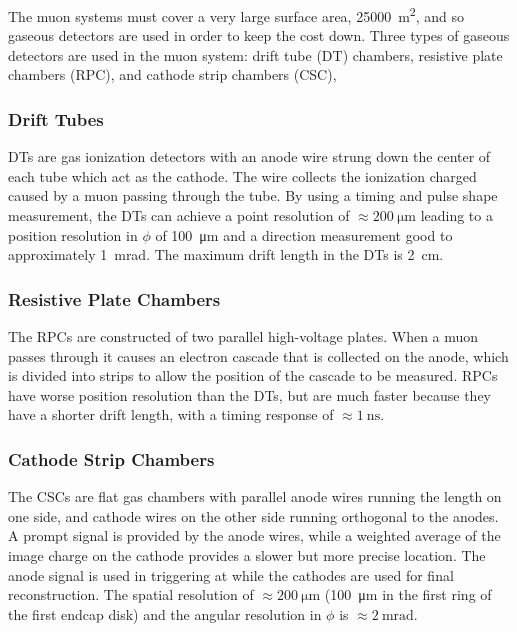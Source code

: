 The muon systems must cover a very large surface area,
\SI{25000}{\meter\squared}, and so gaseous detectors are used in order to keep
the cost down. Three types of gaseous detectors are used in the muon system:
drift tube (DT) chambers, resistive plate chambers (RPC), and cathode strip
chambers (CSC),

\subsubsection{Drift Tubes}

DTs are gas ionization detectors with an anode wire strung down the center of
each tube which act as the cathode. The wire collects the ionization charged
caused by a muon passing through the tube. By using a timing and pulse shape
measurement, the DTs can achieve a point resolution of $\approx
\SI{200}{\micro\meter}$ leading to a position resolution in $\phi$ of
\SI{100}{\micro\meter} and a direction measurement good to approximately
\SI{1}{\milli\radian}. The maximum drift length in the DTs is
\SI{2}{\centi\meter}.

\subsubsection{Resistive Plate Chambers}

The RPCs are constructed of two parallel high-voltage plates. When a muon
passes through it causes an electron cascade that is collected on the anode,
which is divided into strips to allow the position of the cascade to be
measured. RPCs have worse position resolution than the DTs, but are much
faster because they have a shorter drift length, with a timing response of
$\approx \SI{1}{\nano\second}$.

\subsubsection{Cathode Strip Chambers}

The CSCs are flat gas chambers with parallel anode wires running the length on
one side, and cathode wires on the other side running orthogonal to the anodes.
A prompt signal is provided by the anode wires, while a weighted average of the
image charge on the cathode provides a slower but more precise location. The
anode signal is used in triggering at \Lone while the cathodes are used for
final reconstruction. The spatial resolution of $\approx
\SI{200}{\micro\meter}$ (\SI{100}{\micro\meter} in the first ring of the first
endcap disk) and the angular resolution in $\phi$ is $\approx
\SI{2}{\milli\radian}$.

